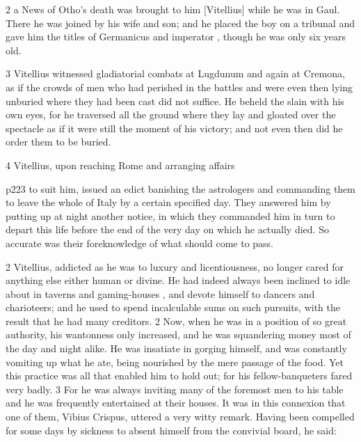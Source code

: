 2 a News of Otho's death was brought to him [Vitellius] while he was in Gaul. There he was joined by his wife and son; and he placed the boy on a tribunal and gave him the titles of Germanicus and imperator , though he was only six years old.

3
Vitellius witnessed gladiatorial combats at Lugdunum and again at Cremona, as if the crowds of men who had perished in the battles and were even then lying unburied where they had been cast did not suffice. He beheld the slain with his own eyes, for he traversed all the ground where they lay and gloated over the spectacle as if it were still the moment of his victory; and not even then did he order them to be buried.

4
Vitellius, upon reaching Rome and arranging affairs

p223 to suit him, issued an edict banishing the astrologers and commanding them to leave the whole of Italy by a certain specified day. They answered him by putting up at night another notice, in which they commanded him in turn to depart this life before the end of the very day on which he actually died. So accurate was their foreknowledge of what should come to pass.

2
Vitellius, addicted as he was to luxury and licentiousness, no longer cared for anything else either human or divine. He had indeed always been inclined to idle about in taverns and gaming-houses , and devote himself to dancers and charioteers; and he used to spend incalculable sums on such pursuits, with the result that he had many creditors. 2 Now, when he was in a position of so great authority, his wantonness only increased, and he was squandering money most of the day and night alike. He was insatiate in gorging himself, and was constantly vomiting up what he ate, being nourished by the mere passage of the food. Yet this practice was all that enabled him to hold out; for his fellow-banqueters fared very badly. 3 For he was always inviting many of the foremost men to his table and he was frequently entertained at their houses. It was in this connexion that one of them, Vibius Crispus, uttered a very witty remark. Having been compelled for some days by sickness to absent himself from the convivial board, he said:

